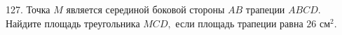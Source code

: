 127. Точка $M$ является серединой боковой стороны $AB$ трапеции $ABCD.$ Найдите площадь треугольника $MCD,$ если площадь  трапеции равна $26\text{ см}^2.$\\
